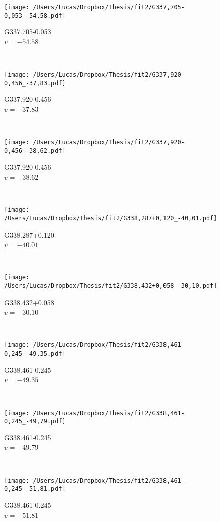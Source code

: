 \begin{figure*}[t]\ContinuedFloat
	\centering
	\begin{subfigure}[t]{0.3\textwidth}
		\texttt{[image: /Users/Lucas/Dropbox/Thesis/fit2/G337,705-0,053\_-54,58.pdf]}
		\caption[]{G337.705-0.053\\$v=-54.58$\,\kms}
	\end{subfigure}
	~
	\begin{subfigure}[t]{0.3\textwidth}
		\texttt{[image: /Users/Lucas/Dropbox/Thesis/fit2/G337,920-0,456\_-37,83.pdf]}
		\caption[]{G337.920-0.456\\$v=-37.83$\,\kms}
	\end{subfigure}
	~
	\begin{subfigure}[t]{0.3\textwidth}
		\texttt{[image: /Users/Lucas/Dropbox/Thesis/fit2/G337,920-0,456\_-38,62.pdf]}
		\caption[]{G337.920-0.456\\$v=-38.62$\,\kms}
	\end{subfigure}
	~
	\begin{subfigure}[t]{0.3\textwidth}
		\texttt{[image: /Users/Lucas/Dropbox/Thesis/fit2/G338,287+0,120\_-40,01.pdf]}
		\caption[]{G338.287+0.120\\$v=-40.01$\,\kms}
	\end{subfigure}
	~
	\begin{subfigure}[t]{0.3\textwidth}
		\texttt{[image: /Users/Lucas/Dropbox/Thesis/fit2/G338,432+0,058\_-30,10.pdf]}
		\caption[]{G338.432+0.058\\$v=-30.10$\,\kms}
	\end{subfigure}
	~
	\begin{subfigure}[t]{0.3\textwidth}
		\texttt{[image: /Users/Lucas/Dropbox/Thesis/fit2/G338,461-0,245\_-49,35.pdf]}
		\caption[]{G338.461-0.245\\$v=-49.35$\,\kms}
	\end{subfigure}
	~
	\begin{subfigure}[t]{0.3\textwidth}
		\texttt{[image: /Users/Lucas/Dropbox/Thesis/fit2/G338,461-0,245\_-49,79.pdf]}
		\caption[]{G338.461-0.245\\$v=-49.79$\,\kms}
	\end{subfigure}
	~
	\begin{subfigure}[t]{0.3\textwidth}
		\texttt{[image: /Users/Lucas/Dropbox/Thesis/fit2/G338,461-0,245\_-51,81.pdf]}
		\caption[]{G338.461-0.245\\$v=-51.81$\,\kms}

\end{subfigure}
\end{figure*}

